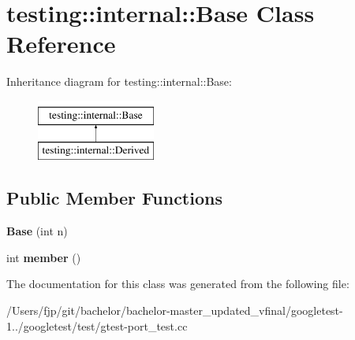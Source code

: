 \hypertarget{classtesting_1_1internal_1_1_base}{}\section{testing\+:\+:internal\+:\+:Base Class Reference}
\label{classtesting_1_1internal_1_1_base}
Inheritance diagram for testing\+:\+:internal\+:\+:Base\+:\begin{figure}[H]
\begin{center}
\leavevmode
\includegraphics[height=2.000000cm]{classtesting_1_1internal_1_1_base}
\end{center}
\end{figure}
\subsection*{Public Member Functions}
\begin{DoxyCompactItemize}
\item 
\mbox{\label{classtesting_1_1internal_1_1_base_a255d105410a1eeb5f4690c9c8cd8e104}} 
{\bfseries Base} (int n)
\item 
\mbox{\label{classtesting_1_1internal_1_1_base_a7ddba6221b56613be545544b7ef6214c}} 
int {\bfseries member} ()
\end{DoxyCompactItemize}


The documentation for this class was generated from the following file\+:\begin{DoxyCompactItemize}
\item 
/\+Users/fjp/git/bachelor/bachelor-\/master\+\_\+updated\+\_\+vfinal/googletest-\/1../googletest/test/gtest-\/port\+\_\+test.\+cc\end{DoxyCompactItemize}
